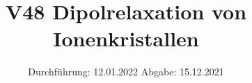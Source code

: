 

\subject{Fortgeschrittenenpraktikum}
\title{V48 Dipolrelaxation von Ionenkristallen}
\date{%
  Durchführung: 12.01.2022
  \hspace{3em}
  Abgabe: 15.12.2021
}



\maketitle
\thispagestyle{empty}
\tableofcontents
\newpage






%

\printbibliography{}





